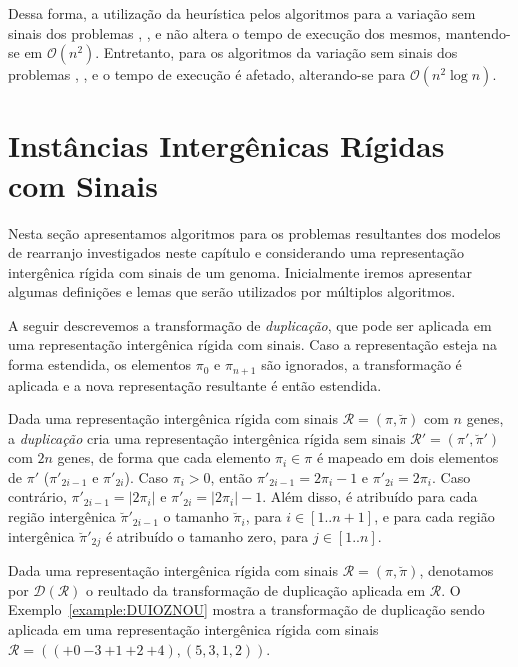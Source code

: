 Dessa forma, a utilização da heurística pelos algoritmos para a variação sem sinais dos problemas \SbIR{}, \SbIRI{}, \SbIRT{} e \SbIRTI{} não altera o tempo de execução dos mesmos, mantendo-se em $\mathcal{O}(n^2)$. Entretanto, para os algoritmos da variação sem sinais dos problemas \SbIRM{}, \SbIRMI{}, \SbIRTM{} e \SbIRTMI{} o tempo de execução é afetado, alterando-se para $\mathcal{O}(n^2 \log n)$.

\section{Instâncias Intergênicas Rígidas com Sinais}

Nesta seção apresentamos algoritmos para os problemas resultantes dos modelos de rearranjo investigados neste capítulo e considerando uma representação intergênica rígida com sinais de um genoma. Inicialmente iremos apresentar algumas definições e lemas que serão utilizados por múltiplos algoritmos.

A seguir descrevemos a transformação de \emph{duplicação}, que pode ser aplicada em uma representação intergênica rígida com sinais. Caso a representação esteja na forma estendida, os elementos $\pi_0$ e $\pi_{n+1}$ são ignorados, a transformação é aplicada e a nova representação resultante é então estendida.

\begin{definition}
Dada uma representação intergênica rígida com sinais $\mathcal{R}=(\pi,\breve\pi)$ com $n$ genes, a \emph{duplicação} cria uma representação intergênica rígida sem sinais $\mathcal{R'}=(\pi',\breve\pi')$ com $2n$ genes, de forma que cada elemento $\pi_i \in \pi$ é mapeado em dois elementos de $\pi'$ ($\pi'_{2i-1}$ e $\pi'_{2i}$). Caso $\pi_i > 0$, então $\pi'_{2i-1} = 2\pi_i-1$ e $\pi'_{2i} = 2\pi_i$. Caso contrário, $\pi'_{2i-1} = |2\pi_i|$ e $\pi'_{2i} = |2\pi_i|-1$. Além disso, é atribuído para cada região intergênica $\breve\pi'_{2i-1}$ o tamanho $\breve\pi_i$, para $i\in[1..{n+1}]$, e para cada região intergênica $\breve\pi'_{2j}$ é atribuído o tamanho zero, para $j\in[1..n]$.
\end{definition}

Dada uma representação intergênica rígida com sinais $\mathcal{R}=(\pi,\breve\pi)$, denotamos por $\mathcal{D}(\mathcal{R})$ o reultado da transformação de duplicação aplicada em $\mathcal{R}$. O Exemplo~\ref{example:DUIOZNOU} mostra a transformação de duplicação sendo aplicada em uma representação intergênica rígida com sinais $\mathcal{R}=(({+0}~{-3}~{+1}~{+2}~{+4}),(5,3,1,2))$.

